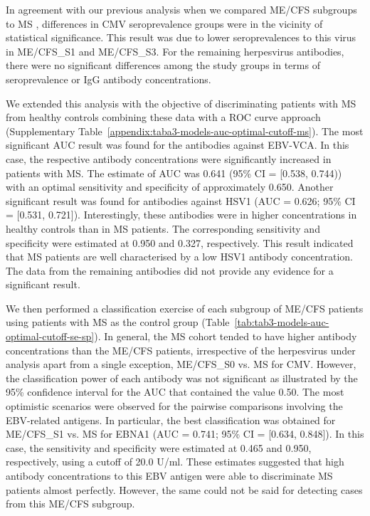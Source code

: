 In agreement with our previous analysis when we compared ME/CFS subgroups to MS \citep{domingues2021HerpesvirusesSerologya}, differences in CMV seroprevalence groups were in the vicinity of statistical significance. This result was due to lower seroprevalences to this virus in ME/CFS\_S1 and ME/CFS\_S3. For the remaining herpesvirus antibodies, there were no significant differences among the study groups in terms of seroprevalence or IgG antibody concentrations.

We extended this analysis with the objective of discriminating patients with MS from healthy controls combining these data with a ROC curve approach (Supplementary Table~\ref{appendix:taba3-models-auc-optimal-cutoff-ms}). The most significant AUC result was found for the antibodies against EBV-VCA. In this case, the respective antibody concentrations were significantly increased in patients with MS. The estimate of AUC was 0.641 (95\% CI = [0.538, 0.744)) with an optimal sensitivity and specificity of approximately 0.650. Another significant result was found for antibodies against HSV1 (AUC = 0.626; 95\% CI = [0.531, 0.721]). Interestingly, these antibodies were in higher concentrations in healthy controls than in MS patients. The corresponding sensitivity and specificity were estimated at 0.950 and 0.327, respectively. This result indicated that MS patients are well characterised by a low HSV1 antibody concentration. The data from the remaining antibodies did not provide any evidence for a significant result.


We then performed a classification exercise of each subgroup of ME/CFS patients using patients with MS as the control group (Table~\ref{tab:tab3-models-auc-optimal-cutoff-se-sp}). In general, the MS cohort tended to have higher antibody concentrations than the ME/CFS patients, irrespective of the herpesvirus under analysis apart from a single exception, ME/CFS\_S0 vs. MS for CMV. However, the classification power of each antibody was not significant as illustrated by the 95\% confidence interval for the AUC that contained the value 0.50. The most optimistic scenarios were observed for the pairwise comparisons involving the EBV-related antigens. In particular, the best classification was obtained for ME/CFS\_S1 vs. MS for EBNA1 (AUC = 0.741; 95\% CI = [0.634, 0.848]). In this case, the sensitivity and specificity were estimated at 0.465 and 0.950, respectively, using a cutoff of 20.0 U/ml. These estimates suggested that high antibody concentrations to this EBV antigen were able to discriminate MS patients almost perfectly. However, the same could not be said for detecting cases from this ME/CFS subgroup.

